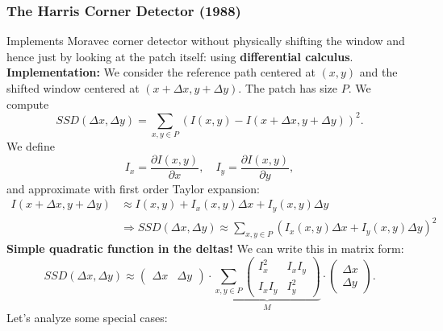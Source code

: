 \documentclass[a4paper,12 pt]{article}
\theoremstyle{definition}
\theoremstyle{remark}
\theoremstyle{definition}
\theoremstyle{definition}
\theoremstyle{definition}
\theoremstyle{remark}
\theoremstyle{definition}
\begin{document}
\subsubsection*{The Harris Corner Detector (1988)}
Implements Moravec corner detector without physically shifting the window and hence just by looking at the patch itself: using \textbf{differential calculus}. \\
\textbf{Implementation:} We consider the reference path centered at $(x,y)$ and the shifted window centered at $(x+\Delta x,y+\Delta y)$. The patch has size $P$. We compute
\begin{equation}
SSD(\Delta x, \Delta y)=\sum_{x,y \in P}\left( I(x,y)-I(x+\Delta x,y+\Delta y)\right)^2.
\end{equation}
We define
\begin{equation}
I_x=\frac{\partial I(x,y)}{\partial x}, \quad I_y=\frac{\partial I(x,y)}{\partial y},
\end{equation}
and approximate with first order Taylor expansion:
\begin{equation}
\begin{split}
I(x+\Delta x,y+\Delta y) &\approx I(x,y)+I_x(x,y)\Delta x + I_y(x,y)\Delta y\\
&\Rightarrow SSD(\Delta x, \Delta y)\approx \sum_{x,y\in P}\left( I_x(x,y)\Delta x+I_y(x,y)\Delta y\right)^2
\end{split}
\end{equation}
\textbf{Simple quadratic function in the deltas!} We can write this in matrix form:
\begin{equation}
SSD(\Delta x, \Delta y)\approx \begin{pmatrix}
 \Delta x & \Delta y 
 \end{pmatrix}\cdot \underbrace{\sum_{x,y\in P} \begin{pmatrix}
I_x^2&I_xI_y \\ I_xI_y&I_y^2
\end{pmatrix}}_{M}\cdot \begin{pmatrix}
 \Delta x\\
 \Delta y
 \end{pmatrix}.
\end{equation}
Let's analyze some special cases:
\end{document}
